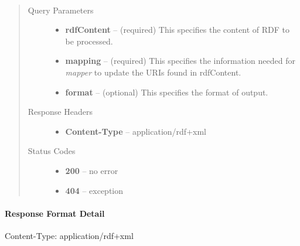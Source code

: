 \documentclass[letterpaper,10pt,english]{sphinxmanual}
\begin{document}
\begin{fulllineitems}
\label{docs/mapper:post--mapper_?rdfContent, mapping, format_}~\begin{quote}\begin{description}
\item[{Query Parameters}] \leavevmode\begin{itemize}
\item {} 
\textbf{rdfContent} -- (required) This specifies the content of RDF to be processed.

\item {} 
\textbf{mapping} -- (required) This specifies the information needed for \emph{mapper} to update the URIs found in rdfContent.

\item {} 
\textbf{format} -- (optional) This specifies the format of output.

\end{itemize}

\item[{Response Headers}] \leavevmode\begin{itemize}
\item {} 
\textbf{Content-Type} -- application/rdf+xml

\end{itemize}

\item[{Status Codes}] \leavevmode\begin{itemize}
\item {} 
\textbf{200} -- no error

\item {} 
\textbf{404} -- exception

\end{itemize}

\end{description}\end{quote}

\end{fulllineitems}



\paragraph{Response Format Detail}
\label{docs/mapper:response-format-detail}
Content-Type: application/rdf+xml
\end{document}
